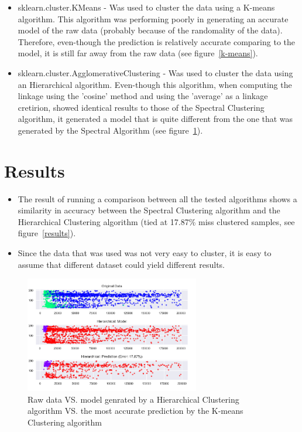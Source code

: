 \documentclass[10pt,twocolumn]{article}
\begin{document}
\begin{enumerate}
\begin{itemize}
      \item sklearn.cluster.KMeans - Was used to cluster the data using a K-means algorithm. This algorithm was performing poorly in generating an accurate model of the raw data (probably because of the randomality of the data). Therefore, even-though the prediction is relatively accurate comparing to the model, it is still far away from the raw data (see figure~\ref{k-means}).

      \item sklearn.cluster.AgglomerativeClustering - Was used to cluster the data using an Hierarchical algorithm. Even-though this algorithm, when computing the linkage using the 'cosine' method and using the 'average' as a linkage cretirion, showed identical results to those of the Spectral Clustering algorithm, it generated a model that is quite different from the one that was generated by the Spectral Algorithm (see figure~\ref{hierarchical}).

    \end{itemize}

\end{enumerate}



\section{Results}
\begin{itemize}
  \item The result of running a comparison between all the tested algorithms shows a similarity in accuracy between the Spectral Clustering algorithm and the Hierarchical Clustering algorithm (tied at 17.87\% miss clustered samples, see figure~\ref{results}).
  \item Since the data that was used was not very easy to cluster, it is easy to assume that different dataset could yield different results.
\end{itemize}

\begin{figure}[!b]
  \begin{center}
    \includegraphics[width=3in]{../plots/hierarchical.png}
  \end{center}
  \label{hierarchical}
  \caption{\small Raw data VS. model genrated by a Hierarchical Clustering algorithm VS. the most accurate prediction by the K-means Clustering algorithm}
\end{figure}
\end{document}
